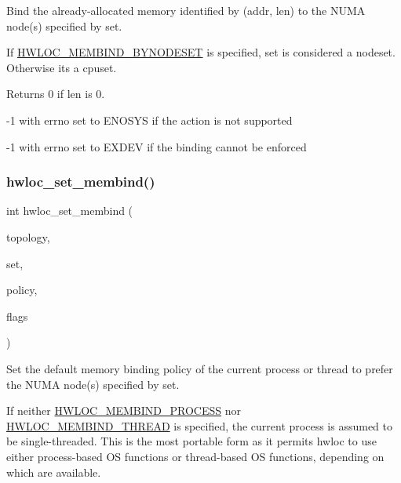 Bind the already-\/allocated memory identified by (addr, len) to the N\+U\+MA node(s) specified by {\ttfamily set}. 

If \hyperlink{a00191_ggab00475fd98815bf4fb9aaf752030e7d2a71f19fe4505f1c083dc8e6f7bdea6256}{H\+W\+L\+O\+C\+\_\+\+M\+E\+M\+B\+I\+N\+D\+\_\+\+B\+Y\+N\+O\+D\+E\+S\+ET} is specified, set is considered a nodeset. Otherwise it\textquotesingle{}s a cpuset.

\begin{DoxyReturn}{Returns}
0 if {\ttfamily len} is 0. 

-\/1 with errno set to E\+N\+O\+S\+YS if the action is not supported 

-\/1 with errno set to E\+X\+D\+EV if the binding cannot be enforced 
\end{DoxyReturn}
\mbox{\label{a00191_ga020951efa0ce3862bd4faec295501a7f}} 
\subsubsection{\texorpdfstring{hwloc\+\_\+set\+\_\+membind()}{hwloc\_set\_membind()}}
{\footnotesize\ttfamily int hwloc\+\_\+set\+\_\+membind (\begin{DoxyParamCaption}\item[{\hyperlink{a00186_ga9d1e76ee15a7dee158b786c30b6a6e38}{hwloc\+\_\+topology\+\_\+t}}]{topology,  }\item[{\hyperlink{a00205_gae991a108af01d408be2776c5b2c467b2}{hwloc\+\_\+const\+\_\+bitmap\+\_\+t}}]{set,  }\item[{\hyperlink{a00191_gac9764f79505775d06407b40f5e4661e8}{hwloc\+\_\+membind\+\_\+policy\+\_\+t}}]{policy,  }\item[{int}]{flags }\end{DoxyParamCaption})}



Set the default memory binding policy of the current process or thread to prefer the N\+U\+MA node(s) specified by {\ttfamily set}. 

If neither \hyperlink{a00191_ggab00475fd98815bf4fb9aaf752030e7d2a1b1b74aef138f64aff214a8cbdfe8eb4}{H\+W\+L\+O\+C\+\_\+\+M\+E\+M\+B\+I\+N\+D\+\_\+\+P\+R\+O\+C\+E\+SS} nor \hyperlink{a00191_ggab00475fd98815bf4fb9aaf752030e7d2a1dc7dd5cdcd5796893a325a524555298}{H\+W\+L\+O\+C\+\_\+\+M\+E\+M\+B\+I\+N\+D\+\_\+\+T\+H\+R\+E\+AD} is specified, the current process is assumed to be single-\/threaded. This is the most portable form as it permits hwloc to use either process-\/based OS functions or thread-\/based OS functions, depending on which are available.


